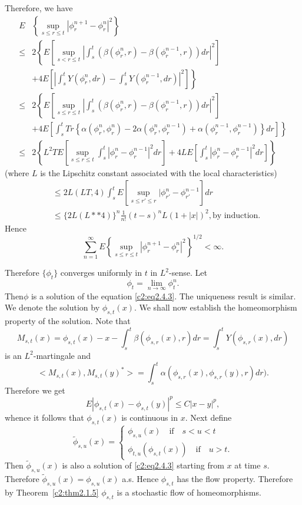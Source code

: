Therefore, we have
\begin{align*}
  E & \left\{\sup _{s \leq r \leq t}|\phi^{n+1}_r-\phi^{n}_r|^2\right\}\\
  \leq & 2 \left\{E \left[\sup_{s < r \leq
      t}|\int^t_s(\beta(\phi^n_r, r) -
    \beta(\phi^{n-1}_r,r))dr|^2\right]\right. \\ 
  &\left. + 4E\left[|\int^t_s Y(\phi^n_r,dr)-\int^t_s
    Y(\phi^{n-1}_r,dr)|^2\right]\right\}\\
  \leq & 2 \left\{E \left[\sup_{s \leq  r \leq
      t}|\int^t_s(\beta(\phi^{n}_{r},r)-\beta(\phi^{n-1}_r,r))dr|^2\right]
  \right.\\ 
  & \left.+4E \left[\int^t_s Tr\left\{\alpha(\phi^n_r,\phi^n_r)-2
    \alpha(\phi^n_r,\phi^{n-1}_r)+\alpha(\phi^{n-1}_r,\phi^{n-1}_r)
    \right\}dr\right]\right\}\\   
  \leq & 2\left\{L^2 TE\left[\sup_{s \leq r \leq t}\int^t_s|\phi^n_r -
    \phi^{n-1}_r|^2 dr\right]+4LE \left[\int^t_s|\phi^n_r - \phi^{n-1}_r|^2
    dr\right] \right\} 
\end{align*}
(where $L$ is the Lipschitz constant associated with the local
characteristics) 
\begin{align*}
&   \leq 2L(LT,4)\int^t_s E\left[\sup_{s \leq r' \leq
      r}|\phi^n_{r'}-\phi^{n-1}_{r'}\right]dr\\ 
 & \leq \{2L(L**4)\}^n \frac{1}{n!}(t-s)^n L(1+|x|)^2, \text{by
    induction}. 
\end{align*}
Hence
$$
\sum^{\infty}_{n=1}E\left\{\sup_{s \leq r \leq
  t}|\phi^{n+1}_{r}-\phi^{n}_{r}|^2\right\}^{1/2}< \infty. 
$$


Therefore $\{\phi_t\}$ converges uniformly in $t$ in $L^2$-sense. Let
$$
\phi_t = \lim_{n \to \infty} \phi^n_t.
$$
Then\pageoriginale $\phi $ is a solution of the equation \eqref{c2:eq2.4.3}. The uniqueness
result is similar. We denote the solution by $\phi_{s,t}(x)$. We shall
now establish the homeomorphism property of the solution. Note that 
$$
M_{s,t}(x)=\phi_{s,t}(x)-x-\int^t_s \beta(\phi_{s,r}(x),r)dr=\int^t_s
Y(\phi_{s,r}(x),dr) 
$$
is an $L^2$-martingale and
$$
< M_{s,t}(x),M_{s,t}(y)^*> = \int^t_s \alpha(\phi_{s,r}(x),\phi_{s,r}(y),r)dr).
$$
Therefore we get
$$
E| \phi_{s,t}(x)-\phi_{s,t}(y)|^p \leq C|x-y|^p,
$$
whence it follows that $\phi_{s,t}(x)$ is continuous in $x$. Next define
\begin{equation*}
  \tilde{\phi}_{s,u}(x)=
  \begin{cases}
    \phi_{s,u}(x) \quad \text{if} \quad s <u <t\\
    \phi_{t,u}(\phi_{s,t}(x)) \quad \text{if} \quad u > t.
  \end{cases}
\end{equation*}
Then $\tilde{\phi}_{s,u}(x)$ is also a solution of \eqref{c2:eq2.4.3} starting
from $x$ at time $s$. Therefore $\tilde{\phi}_{s,u}(x)=\phi_{s,u}(x)$
a.s. Hence $\phi_{s,t}$ has the flow property. Therefore by 
Theorem~\ref{c2:thm2.1.5} $\phi_{s,t}$ is a stochastic flow of homeomorphisms. 

